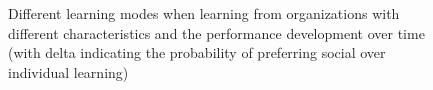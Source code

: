 \begin{figure}[htb]
	\centering
	\quad
	\label{fig:f2}
	\caption{Different learning modes when learning from organizations with different characteristics and the performance development over time (with delta indicating the probability of preferring social over individual learning)}
\end{figure}



